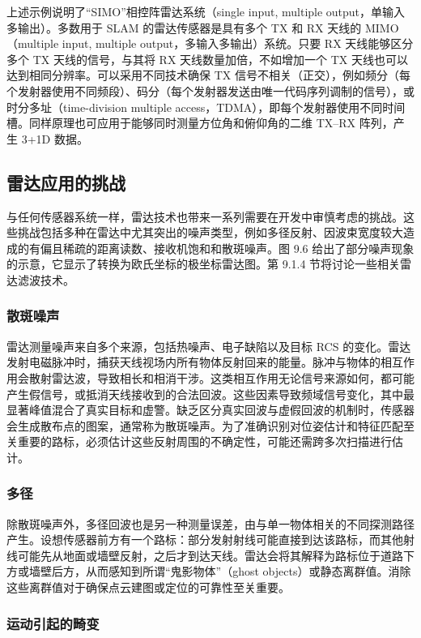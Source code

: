 上述示例说明了“SIMO”相控阵雷达系统（single input, multiple output，单输入多输出）。多数用于 SLAM 的雷达传感器是具有多个 TX 和 RX 天线的 MIMO（multiple input, multiple output，多输入多输出）系统。只要 RX 天线能够区分多个 TX 天线的信号，与其将 RX 天线数量加倍，不如增加一个 TX 天线也可以达到相同分辨率。可以采用不同技术确保 TX 信号不相关（正交），例如频分（每个发射器使用不同频段）、码分（每个发射器发送由唯一代码序列调制的信号），或时分多址（time-division multiple access，TDMA），即每个发射器使用不同时间槽。同样原理也可应用于能够同时测量方位角和俯仰角的二维 TX--RX 阵列，产生 3+1D 数据。

\subsection{雷达应用的挑战}

与任何传感器系统一样，雷达技术也带来一系列需要在开发中审慎考虑的挑战。这些挑战包括多种在雷达中尤其突出的噪声类型，例如多径反射、因波束宽度较大造成的有偏且稀疏的距离读数、接收机饱和和散斑噪声。图 9.6 给出了部分噪声现象的示意，它显示了转换为欧氏坐标的极坐标雷达图。第 9.1.4 节将讨论一些相关雷达滤波技术。

\subsubsection{散斑噪声}

雷达测量噪声来自多个来源，包括热噪声、电子缺陷以及目标 RCS 的变化。雷达发射电磁脉冲时，捕获天线视场内所有物体反射回来的能量。脉冲与物体的相互作用会散射雷达波，导致相长和相消干涉。这类相互作用无论信号来源如何，都可能产生假信号，或抵消天线接收到的合法回波。这些因素导致频域信号变化，其中最显著峰值混合了真实目标和虚警。缺乏区分真实回波与虚假回波的机制时，传感器会生成散布点的图案，通常称为散斑噪声。为了准确识别对位姿估计和特征匹配至关重要的路标，必须估计这些反射周围的不确定性，可能还需跨多次扫描进行估计。

\subsubsection{多径}

除散斑噪声外，多径回波也是另一种测量误差，由与单一物体相关的不同探测路径产生。设想传感器前方有一个路标：部分发射射线可能直接到达该路标，而其他射线可能先从地面或墙壁反射，之后才到达天线。雷达会将其解释为路标位于道路下方或墙壁后方，从而感知到所谓“鬼影物体”（ghost objects）或静态离群值。消除这些离群值对于确保点云建图或定位的可靠性至关重要。

\subsubsection{运动引起的畸变}

